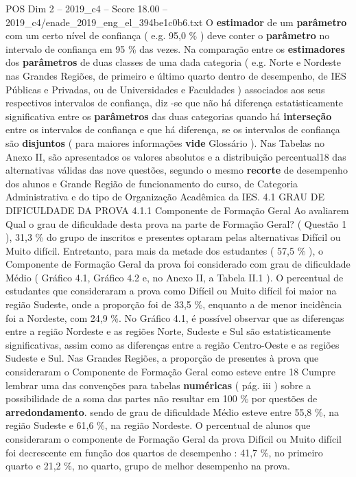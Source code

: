 \begin{textsample}{POS Dim 2 – 2019\_c4 – Score 18.00 – 2019\_c4/enade\_2019\_eng\_el\_394be1c0b6.txt}
O \textbf{estimador} de um \textbf{parâmetro} com um certo nível de confiança ( e.g. 95,0 \% ) deve conter o \textbf{parâmetro} no intervalo de confiança em 95 \% das vezes.
Na comparação entre os \textbf{estimadores} dos \textbf{parâmetros} de duas classes de uma dada categoria ( e.g.
Norte e Nordeste nas Grandes Regiões, de primeiro e último quarto dentro de desempenho, de IES Públicas e Privadas, ou de Universidades e Faculdades ) associados aos seus respectivos intervalos de confiança, diz -se que não há diferença estatisticamente significativa entre os \textbf{parâmetros} das duas categorias quando há \textbf{interseção} entre os intervalos de confiança e que há diferença, se os intervalos de confiança são \textbf{disjuntos} ( para maiores informações \textbf{vide} Glossário ).
Nas Tabelas no Anexo II, são apresentados os valores absolutos e a distribuição percentual18 das alternativas válidas das nove questões, segundo o mesmo \textbf{recorte} de desempenho dos alunos e Grande Região de funcionamento do curso, de Categoria Administrativa e do tipo de Organização Acadêmica da IES. 4.1 GRAU DE DIFICULDADE DA PROVA 4.1.1 Componente de Formação Geral Ao avaliarem Qual o grau de dificuldade desta prova na parte de Formação Geral? ( Questão 1 ), 31,3 \% do grupo de inscritos e presentes optaram pelas alternativas Difícil ou Muito difícil.
Entretanto, para mais da metade dos estudantes ( 57,5 \% ), o Componente de Formação Geral da prova foi considerado com grau de dificuldade Médio ( Gráfico 4.1, Gráfico 4.2 e, no Anexo II, a Tabela II.1 ).
O percentual de estudantes que consideraram a prova como Difícil ou Muito difícil foi maior na região Sudeste, onde a proporção foi de 33,5 \%, enquanto a de menor incidência foi a Nordeste, com 24,9 \%.
No Gráfico 4.1, é possível observar que as diferenças entre a região Nordeste e as regiões Norte, Sudeste e Sul são estatisticamente significativas, assim como as diferenças entre a região Centro-Oeste e as regiões Sudeste e Sul.
Nas Grandes Regiões, a proporção de presentes à prova que consideraram o Componente de Formação Geral como esteve entre 18 Cumpre lembrar uma das convenções para tabelas \textbf{numéricas} ( pág. iii ) sobre a possibilidade de a soma das partes não resultar em 100 \% por questões de \textbf{arredondamento}. sendo de grau de dificuldade Médio esteve entre 55,8 \%, na região Sudeste e 61,6 \%, na região Nordeste.
O percentual de alunos que consideraram o componente de Formação Geral da prova Difícil ou Muito difícil foi decrescente em função dos quartos de desempenho : 41,7 \%, no primeiro quarto e 21,2 \%, no quarto, grupo de melhor desempenho na prova.

\end{textsample}
